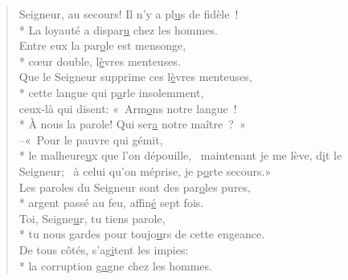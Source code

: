 
\begin{verse}
Seigneur, au secours! Il n’y a pl\underline{u}s de fidèle ! \\*
La loyauté a dispar\underline{u} chez les hommes. \\
Entre eux la par\underline{o}le est mensonge, \\*
cœur double, l\underline{è}vres menteuses. \\

Que le Seigneur supprime ces l\underline{è}vres menteuses, \\*
cette langue qui p\underline{a}rle insolemment, \\
ceux-là qui disent: « Arm\underline{o}ns notre langue ! \\*
À nous la parole! Qui ser\underline{a} notre maître ? » \\

–« Pour le pauvre qui gémit, \\*
le malheure\underline{u}x que l’on dépouille,~\psalmdagger
maintenant je me lève, d\underline{i}t le Seigneur;~\psalmstar
à celui qu’on méprise, je p\underline{o}rte secours.» \\

Les paroles du Seigneur sont des par\underline{o}les pures, \\*
argent passé au feu, affin\underline{é} sept fois. \\
Toi, Seigne\underline{u}r, tu tiens parole, \\*
tu nous gardes pour toujo\underline{u}rs de cette engeance. \\

De tous côtés, s’ag\underline{i}tent les impies: \\*
la corruption g\underline{a}gne chez les hommes. \\
\end{verse}

